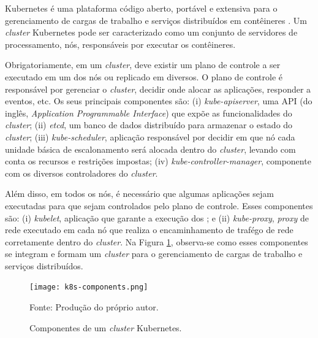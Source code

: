 Kubernetes é uma plataforma  código aberto, portável e extensiva para o gerenciamento de cargas de trabalho e serviços distribuídos em contêineres \cite{google2023kubernetes}. Um \textit{cluster} Kubernetes pode ser caracterizado como um conjunto de servidores de processamento, nós, responsáveis por executar os contêineres. 

Obrigatoriamente, em um \textit{cluster}, deve existir um plano de controle a ser executado em um dos nós ou replicado em diversos. O plano de controle é responsável por gerenciar o \textit{cluster}, decidir onde alocar as aplicações, responder a eventos, etc. Os seus principais componentes são: (i) \textit{kube-apiserver}, uma API (do inglês, \textit{Application Programmable Interface}) que expõe as funcionalidades do \textit{cluster}; (ii) \textit{etcd}, um banco de dados distribuído para armazenar o estado do \textit{cluster}; (iii) \textit{kube-scheduler}, aplicação responsável por decidir em que nó cada unidade básica de escalonamento será alocada dentro do \textit{cluster}, levando com conta os recursos e restrições impostas; (iv) \textit{kube-controller-manager}, componente com os diversos controladores do \textit{cluster}.

Além disso, em todos os nós, é necessário que algumas aplicações sejam executadas para que sejam controlados pelo plano de controle. Esses componentes são: (i) \textit{kubelet}, aplicação que garante a execução dos ; e (ii) \textit{kube-proxy}, \textit{proxy} de rede executado em cada nó que realiza o encaminhamento de trafégo de rede corretamente dentro do \textit{cluster}. Na Figura \ref{fig:kubernetes-componentes}, observa-se como esses componentes se integram e formam um \textit{cluster} para o gerenciamento de cargas de trabalho e serviços distribuídos.


\begin{figure}[ht]
    \centering
    \texttt{[image: k8s-components.png]}
    \caption{Componentes de um \textit{cluster} Kubernetes.}
    \footnotesize Fonte: Produção do próprio autor.
    \label{fig:kubernetes-componentes}
\end{figure}

